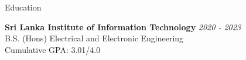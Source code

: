 \documentclass[
	11pt, %
]{./assets/resume} %
\begin{document}
\begin{rSection}{Education}

	\textbf{Sri Lanka Institute of Information Technology} \hfill \textit{2020 - 2023} \\ 
	B.S. (Hons) Electrical and Electronic Engineering \\
	Cumulative  GPA: 3.01/4.0 \\
	
\end{rSection}

\end{document}
